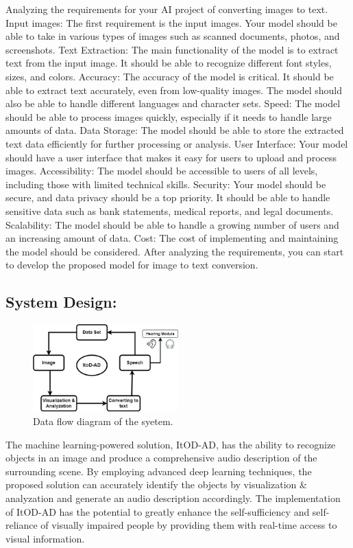 \begin{enumerate}
Analyzing the requirements for your AI project of converting images to text.
Input images: The first requirement is the input images. Your model should be able to take in various types of images such as scanned documents, photos, and screenshots.
Text Extraction: The main functionality of the model is to extract text from the input image. It should be able to recognize different font styles, sizes, and colors.
Accuracy: The accuracy of the model is critical. It should be able to extract text accurately, even from low-quality images. The model should also be able to handle different languages and character sets.
Speed: The model should be able to process images quickly, especially if it needs to handle large amounts of data.
Data Storage: The model should be able to store the extracted text data efficiently for further processing or analysis.
User Interface: Your model should have a user interface that makes it easy for users to upload and process images.
Accessibility: The model should be accessible to users of all levels, including those with limited technical skills.
Security: Your model should be secure, and data privacy should be a top priority. It should be able to handle sensitive data such as bank statements, medical reports, and legal documents.
Scalability: The model should be able to handle a growing number of users and an increasing amount of data.
Cost: The cost of implementing and maintaining the model should be considered. After analyzing the requirements, you can start to develop the proposed model for image to text conversion.

\subsection{System Design:}
\begin{figure}[htbp]
\centerline{\includegraphics[width=0.5\textwidth,height=0.3\textwidth]{pic 1.jpg}}
\caption{Data flow diagram of the syetem.}
\label{fig}
\end{figure}
The machine learning-powered solution, ItOD-AD, has the ability to recognize objects in an image and produce a comprehensive audio description of the surrounding scene. By employing advanced deep learning techniques, the proposed solution can accurately identify the objects by visualization \& analyzation and generate an audio description accordingly. The implementation of ItOD-AD has the potential to greatly enhance the self-sufficiency and self-reliance of visually impaired people by providing them with real-time access to visual information.



\end{enumerate}
